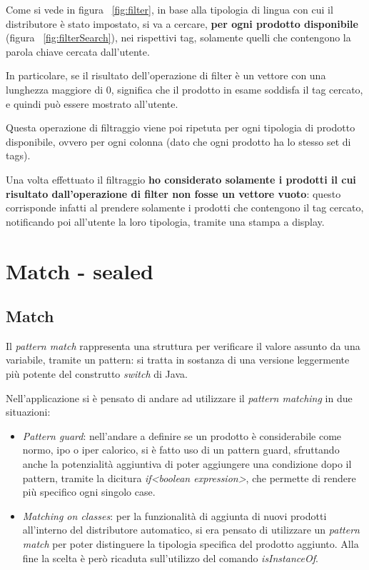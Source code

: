 Come si vede in figura ~\ref{fig:filter}, in base alla tipologia di lingua con cui il distributore è stato impostato, si va a cercare, \textbf{per ogni prodotto disponibile} (figura ~\ref{fig:filterSearch}), nei rispettivi tag, solamente quelli che contengono la parola chiave cercata dall'utente.

In particolare, se il risultato dell'operazione di filter è un vettore con una lunghezza maggiore di 0, significa che il prodotto in esame soddisfa il tag cercato, e quindi può essere mostrato all'utente. 

Questa operazione di filtraggio viene poi ripetuta per ogni tipologia di prodotto disponibile, ovvero per ogni colonna (dato che ogni prodotto ha lo stesso set di tags).

Una volta effettuato il filtraggio \textbf{ho considerato solamente i prodotti il cui risultato dall'operazione di filter non fosse un vettore vuoto}: questo corrisponde infatti al prendere solamente i prodotti che contengono il tag cercato, notificando poi all'utente la loro tipologia, tramite una stampa a display.

\section{Match - sealed}
\label{sec:match_sealed}
\subsection{Match}
Il \textit{pattern match} rappresenta una struttura per verificare il valore assunto da una variabile, tramite un pattern: si tratta in sostanza di una versione leggermente più potente del construtto \textit{switch} di Java.

Nell'applicazione si è pensato di andare ad utilizzare il \textit{pattern matching} in due situazioni:
\begin{itemize}
	\item \textit{Pattern guard}: nell'andare a definire se un prodotto è considerabile come normo, ipo o iper calorico, si è fatto uso di un pattern guard, sfruttando anche la potenzialità aggiuntiva di poter aggiungere una condizione dopo il pattern, tramite la dicitura \textit{if<boolean expression>}, che permette di rendere più specifico ogni singolo case.
	\item \textit{Matching on classes}: per la funzionalità di aggiunta di nuovi prodotti all'interno del distributore automatico, si era pensato di utilizzare un \textit{pattern match} per poter distinguere la tipologia specifica del prodotto aggiunto. Alla fine la scelta è però ricaduta sull'utilizzo del comando \textit{isInstanceOf}.
\end{itemize}
